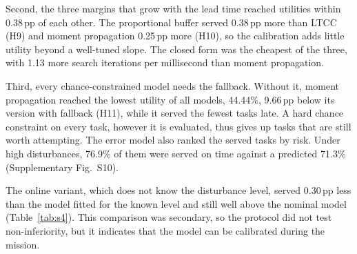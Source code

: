 \documentclass[a4paper,fleqn]{cas-dc}
\newcommand{\mname}{LTCC}  %
\newcounter{prop}
\begin{document}
Second, the three margins that grow with the lead time reached utilities within 0.38\,pp of each other.
The proportional buffer served 0.38\,pp more than \mname{} (H9) and moment propagation
0.25\,pp more (H10), so the calibration adds little utility beyond a well-tuned slope. The closed form was
the cheapest of the three, with 1.13 more search iterations per millisecond than moment propagation.

Third, every chance-constrained model needs the fallback. Without it, moment propagation reached the lowest utility of
all models, 44.44\%, 9.66\,pp below its version with fallback (H11), while it served the fewest
tasks late. A hard chance constraint on every task, however it is evaluated, thus gives up tasks that are still worth
attempting. The error model also ranked the served tasks by risk. Under high disturbances, 76.9\% of
them were served on time against a predicted 71.3\% (Supplementary Fig.~S10).

The online variant, which does not know the disturbance level, served 0.30\,pp less than the model
fitted for the known level and still well above the nominal model (Table~\ref{tab:s4}). This comparison was secondary,
so the protocol did not test non-inferiority, but it indicates that the model can be calibrated during the mission.
\end{document}
